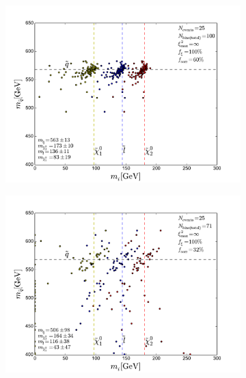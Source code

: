\documentclass[twoside,english]{uiofysmaster}
\begin{document}
\begin{figure}[hbt]
	\centering
	\begin{subfigure}[b]{0.45\textwidth}
		\includegraphics[width=\textwidth]{figures/webber_rec_table/webber_HW-rec_nocut.pdf} 
		\caption{ }
	\end{subfigure}
	\begin{subfigure}[b]{0.45\textwidth}
		\includegraphics[width=\textwidth]{figures/webber_rec_table/webber-rec_wrong_starting_point-400-300-200-100_lowtol.pdf}
		\caption{ } 
	\end{subfigure}


\end{figure}
\end{document}
